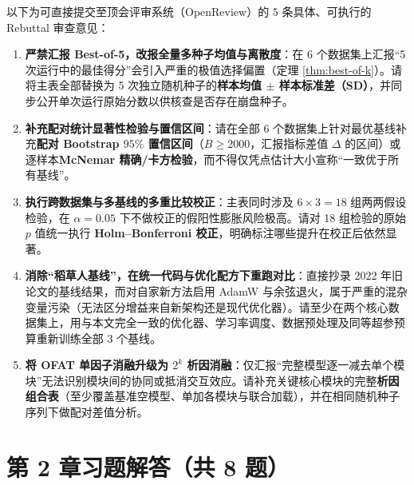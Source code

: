 以下为可直接提交至顶会评审系统（OpenReview）的 $5$ 条具体、可执行的 Rebuttal 审查意见：
\begin{enumerate}
  \item \textbf{严禁汇报 Best-of-5，改报全量多种子均值与离散度}：在 6 个数据集上汇报“5 次运行中的最佳得分”会引入严重的极值选择偏置（定理 \ref{thm:best-of-k}）。请将主表全部替换为 5 次独立随机种子的\textbf{样本均值 $\pm$ 样本标准差（SD）}，并同步公开单次运行原始分数以供核查是否存在崩盘种子。
  \item \textbf{补充配对统计显著性检验与置信区间}：请在全部 6 个数据集上针对最优基线补充\textbf{配对 Bootstrap $95\%$ 置信区间}（$B \ge 2000$，汇报指标差值 $\Delta$ 的区间）或逐样本\textbf{McNemar 精确/卡方检验}，而不得仅凭点估计大小宣称“一致优于所有基线”。
  \item \textbf{执行跨数据集与多基线的多重比较校正}：主表同时涉及 $6 \times 3 = 18$ 组两两假设检验，在 $\alpha = 0.05$ 下不做校正的假阳性膨胀风险极高。请对 18 组检验的原始 $p$ 值统一执行 \textbf{Holm--Bonferroni 校正}，明确标注哪些提升在校正后依然显著。
  \item \textbf{消除“稻草人基线”，在统一代码与优化配方下重跑对比}：直接抄录 2022 年旧论文的基线结果，而对自家新方法启用 AdamW 与余弦退火，属于严重的混杂变量污染（无法区分增益来自新架构还是现代优化器）。请至少在两个核心数据集上，用与本文完全一致的优化器、学习率调度、数据预处理及同等超参预算重新训练全部 3 个基线。
  \item \textbf{将 OFAT 单因子消融升级为 $2^k$ 析因消融}：仅汇报“完整模型逐一减去单个模块”无法识别模块间的协同或抵消交互效应。请补充关键核心模块的完整\textbf{析因组合表}（至少覆盖基准空模型、单加各模块与联合加载），并在相同随机种子序列下做配对差值分析。
\end{enumerate}

\section*{第 2 章习题解答（共 8 题）}


